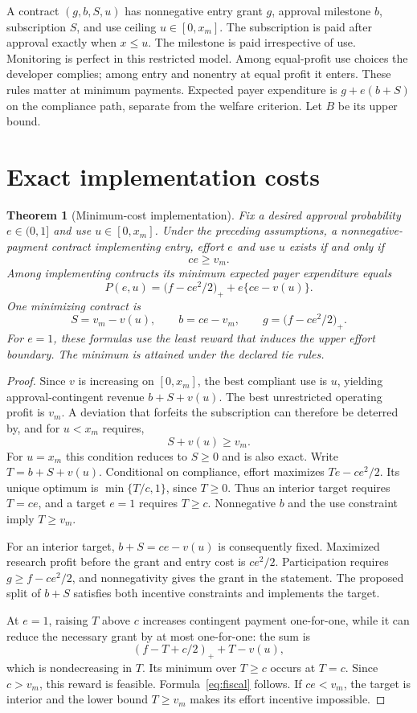 \documentclass[11pt,a4paper]{article}
\newtheorem{theorem}{Theorem}[section]
\theoremstyle{definition}
\theoremstyle{remark}
\begin{document}
A contract $(g,b,S,u)$ has nonnegative entry grant $g$, approval milestone $b$, subscription $S$, and use ceiling $u\in[0,x_m]$. The subscription is paid after approval exactly when $x\leq u$. The milestone is paid irrespective of use. Monitoring is perfect in this restricted model. Among equal-profit use choices the developer complies; among entry and nonentry at equal profit it enters. These rules matter at minimum payments. Expected payer expenditure is $g+e(b+S)$ on the compliance path, separate from the welfare criterion. Let $B$ be its upper bound.

\section{Exact implementation costs}
\begin{theorem}[Minimum-cost implementation]\label{th:implement}
Fix a desired approval probability $e\in(0,1]$ and use $u\in[0,x_m]$. Under the preceding assumptions, a nonnegative-payment contract implementing entry, effort $e$ and use $u$ exists if and only if
\[
 ce\geq v_m.
\]
Among implementing contracts its minimum expected payer expenditure equals
\begin{equation}\label{eq:fiscal}
 P(e,u)=\bigl(f-ce^2/2\bigr)_++e\{ce-v(u)\}.
\end{equation}
One minimizing contract is
\[
 S=v_m-v(u),\qquad b=ce-v_m,\qquad
 g=\bigl(f-ce^2/2\bigr)_+.
\]
For $e=1$, these formulas use the least reward that induces the upper effort boundary. The minimum is attained under the declared tie rules.
\end{theorem}
\begin{proof}
Since $v$ is increasing on $[0,x_m]$, the best compliant use is $u$, yielding approval-contingent revenue $b+S+v(u)$. The best unrestricted operating profit is $v_m$. A deviation that forfeits the subscription can therefore be deterred by, and for $u<x_m$ requires,
\[
 S+v(u)\geq v_m.
\]
For $u=x_m$ this condition reduces to $S\geq0$ and is also exact. Write $T=b+S+v(u)$. Conditional on compliance, effort maximizes $Te-ce^2/2$. Its unique optimum is $\min\{T/c,1\}$, since $T\geq0$. Thus an interior target requires $T=ce$, and a target $e=1$ requires $T\geq c$. Nonnegative $b$ and the use constraint imply $T\geq v_m$.

For an interior target, $b+S=ce-v(u)$ is consequently fixed. Maximized research profit before the grant and entry cost is $ce^2/2$. Participation requires $g\geq f-ce^2/2$, and nonnegativity gives the grant in the statement. The proposed split of $b+S$ satisfies both incentive constraints and implements the target.

At $e=1$, raising $T$ above $c$ increases contingent payment one-for-one, while it can reduce the necessary grant by at most one-for-one: the sum is
\[
 (f-T+c/2)_++T-v(u),
\]
which is nondecreasing in $T$. Its minimum over $T\geq c$ occurs at $T=c$. Since $c>v_m$, this reward is feasible. Formula~\eqref{eq:fiscal} follows. If $ce<v_m$, the target is interior and the lower bound $T\geq v_m$ makes its effort incentive impossible.
\end{proof}
\end{document}
